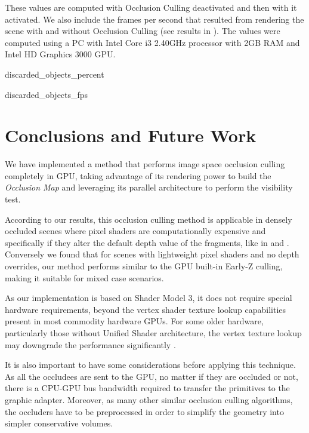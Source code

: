 \documentclass[10pt, conference]{IEEEtran}
\begin{document}
These values are computed with Occlusion Culling deactivated and then with it activated. 
We also include the frames per second that resulted from rendering the scene with and without Occlusion Culling (see results in ). 
The values were computed using a PC with Intel Core i3 2.40GHz processor with 2GB RAM and Intel HD Graphics 3000 GPU.

{discarded_objects_percent}{
%
}

{discarded_objects_fps}{
%
}


\section{Conclusions and Future Work}
%
We have implemented a method that performs image space occlusion culling completely in GPU, taking advantage of its rendering power to 
build the \emph{Occlusion Map} and leveraging its parallel architecture to perform the visibility test.\

According to our results, this occlusion culling method is applicable in densely occluded scenes where pixel shaders are computationally 
expensive and specifically if they alter the default depth value of the fragments, like in \cite{z_correct_bump_1} and \cite{z_correct_bump_2}. 
Conversely we found that for scenes with lightweight pixel shaders and no depth overrides, our method performs similar to the GPU built-in Early-Z 
culling, making it suitable for mixed case scenarios.\

As our implementation is based on Shader Model 3, it does not require special hardware requirements, beyond the vertex shader texture lookup 
capabilities present in most commodity hardware GPUs. 
For some older hardware, particularly those without Unified Shader architecture, the vertex texture lookup may downgrade the performance significantly \cite{nv_programming_guide}.\

It is also important to have some considerations before applying this technique. 
As all the occludees are sent to the GPU, no matter if they are occluded or not, there is a CPU-GPU bus bandwidth required to transfer the primitives to the graphic adapter.
Moreover, as many other similar occlusion culling algorithms, the occluders have to be preprocessed in order to simplify the geometry into simpler conservative volumes.\
 
\end{document}
